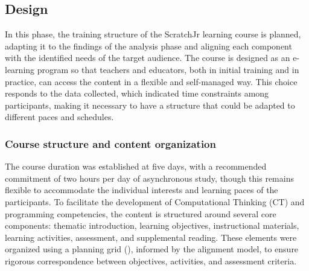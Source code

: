 \documentclass[english]{textolivre}
\begin{document}
\subsection{Design}\label{sec-secoes}
In this phase, the training structure of the ScratchJr learning course is planned, adapting it to the findings of the analysis phase and aligning each component with the identified needs of the target audience. The course is designed as an e-learning program so that teachers and educators, both in initial training and in practice, can access the content in a flexible and self-managed way. This choice responds to the data collected, which indicated time constraints among participants, making it necessary to have a structure that could be adapted to different paces and schedules.

\subsubsection{Course structure and content organization}\label{sec-format-simple}
The course duration was established at five days, with a recommended commitment of two hours per day of asynchronous study, though this remains flexible to accommodate the individual interests and learning paces of the participants. To facilitate the development of Computational Thinking (CT) and programming competencies, the content is structured around several core components: thematic introduction, learning objectives, instructional materials, learning activities, assessment, and supplemental reading. These elements were organized using a planning grid (), informed by the \textcite{mcgee2012blended} alignment model, to ensure rigorous correspondence between objectives, activities, and assessment criteria.
\end{document}
